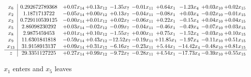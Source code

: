 \documentclass[9pt]{article}
\begin{document}
 \[\begin{array}{c| c c@{\hskip 2pt} c@{\hskip 2pt} c@{\hskip 2pt} c@{\hskip 2pt} c@{\hskip 2pt} c@{\hskip 2pt} c@{\hskip 2pt} c@{\hskip 2pt} }
 x_{6}   &  0.292672789368 & +  0.07 x_{14} & +  0.13 x_{12} & -1.35 x_{7} & -0.01 x_{11} & +  0.64 x_{1} & -1.23 x_{4} & +  0.03 x_{10} & +  0.02 x_{15}\\
 x_{2}   &  1.1871713722 & -0.05 x_{14} & +  0.00 x_{12} & +  0.13 x_{7} & -0.04 x_{11} & -0.08 x_{1} & +  0.03 x_{4} & -0.02 x_{10} & -0.01 x_{15}\\
 x_{3}   &  0.729110539125 & -0.00 x_{14} & +  0.01 x_{12} & +  0.02 x_{7} & -0.06 x_{11} & +  0.22 x_{1} & -0.15 x_{4} & +  0.04 x_{10} & +  0.04 x_{15}\\
 x_{5}   &  2.86098230292 & +  0.03 x_{14} & -0.02 x_{12} & -0.09 x_{7} & -0.04 x_{11} & -0.46 x_{1} & -0.49 x_{4} & -0.07 x_{10} & +  0.03 x_{15}\\
 x_{8}   &  2.9875459453 & +  0.01 x_{14} & +  0.10 x_{12} & -1.55 x_{7} & +  0.00 x_{11} & +  0.75 x_{1} & -1.52 x_{4} & -0.03 x_{10} & +  0.10 x_{15}\\
 x_{9}   &  11.6301841818 & -0.59 x_{14} & +  0.43 x_{12} & -12.52 x_{7} & -0.19 x_{11} & + 11.85 x_{1} & -1.97 x_{4} & -0.11 x_{10} & +  0.51 x_{15}\\
 x_{13}   &  31.9158913137 & +  0.09 x_{14} & +  0.31 x_{12} & -6.16 x_{7} & -0.23 x_{11} & +  5.44 x_{1} & -14.42 x_{4} & -0.48 x_{10} & +  0.81 x_{15}\\
\hline
z    &  29.3351127225 & +  0.27 x_{14} & +  0.99 x_{12} & -9.72 x_{7} & -0.28 x_{11} & +  4.54 x_{1} & -17.73 x_{4} & -0.39 x_{10} & +  0.55 x_{15}\\
\end{array}\]


 $ x_{1} $ enters and $ x_{5} $ leaves 
\end{document}
